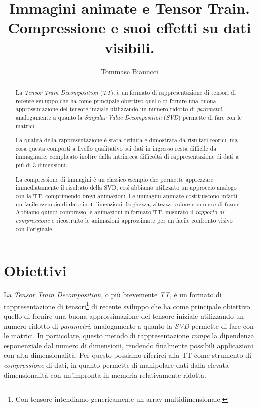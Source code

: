\documentclass[11pt,a4paper]{article}
\title{Immagini animate e Tensor Train.\\Compressione e suoi effetti su dati visibili.}
\author{Tommaso Bianucci}
\begin{document}
\maketitle

\begin{abstract}
  La \emph{Tensor Train Decomposition} (\emph{TT}), è un formato di rappresentazione di tensori di recente sviluppo che ha come principale obiettivo quello di fornire una buona approssimazione del tensore iniziale utilizzando un numero ridotto di \emph{parametri}, analogamente a quanto la \emph{Singular Value Decomposition} (\emph{SVD}) permette di fare con le matrici.


  La qualità della rappresentazione è stata definita e dimostrata da risultati teorici, ma cosa questa comporti a livello qualitativo sui dati in ingresso resta difficile da immaginare, complicato inoltre dalla intrinseca difficoltà di rappresentazione di dati a più di 3 dimensioni.

  La compressione di immagini è un classico esempio che permette apprezzare immediatamente il risultato della SVD, così abbiamo utilizzato un approccio analogo con la TT, comprimendo brevi animazioni.
  Le immagini animate costituiscono infatti un facile esempio di dato in 4 dimensioni: larghezza, altezza, colore e numero di frame.
  Abbiamo quindi compresso le animazioni in formato TT, misurato il \emph{rapporto di compressione} e ricostruito le animazioni approssimate per un facile confronto visivo con l'originale. 
\end{abstract}

\tableofcontents

\section{Obiettivi}
La \emph{Tensor Train Decomposition}, o più brevemente \emph{TT}, è un formato di rappresentazione di tensori\footnote{Con tensore intendiamo genericamente un array multidimensionale.} di recente sviluppo che ha come principale obiettivo quello di fornire una buona approssimazione del tensore iniziale utilizzando un numero ridotto di \emph{parametri}, analogamente a quanto la \emph{SVD} permette di fare con le matrici.
In particolare, questo metodo di rappresentazione \emph{rompe} la dipendenza esponenziale dal numero di dimensioni, rendendo finalmente possibili applicazioni con alta dimensionalità.
Per questo possiamo riferirci alla TT come strumento di \emph{compressione} di dati, in quanto permette di manipolare dati dalla elevata dimensionalità con un'impronta in memoria relativamente ridotta.
\end{document}
